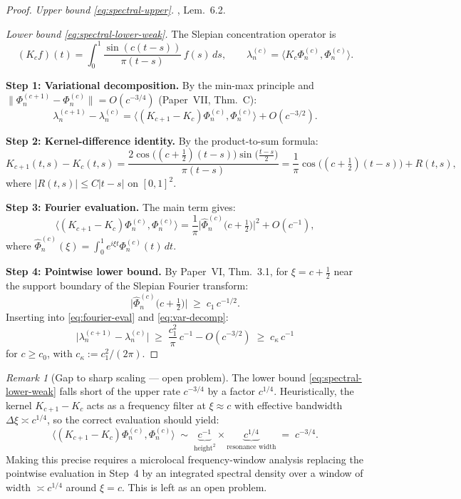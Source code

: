\documentclass[12pt,a4paper]{amsart}
\theoremstyle{definition}
\theoremstyle{remark}
\newtheorem{remark}[theorem]{Remark}
\newcommand{\Phihat}{\widehat{\Phi}}
\begin{document}
\begin{proof}
\textit{Upper bound \eqref{eq:spectral-upper}.}
\cite{PaperVII}, Lem.~6.2.

\textit{Lower bound \eqref{eq:spectral-lower-weak}.}
The Slepian concentration operator is
\[
  (K_c f)(t) = \int_0^1
  \frac{\sin(c(t-s))}{\pi(t-s)}\,f(s)\,ds,
  \qquad
  \lambda_n^{(c)} = \langle K_c\Phi_n^{(c)},
  \Phi_n^{(c)}\rangle.
\]

\textbf{Step 1: Variational decomposition.}
By the min-max principle and
$\|\Phi_n^{(c+1)} - \Phi_n^{(c)}\| = O(c^{-3/4})$
(Paper~VII, Thm.~C):
\begin{equation}\label{eq:var-decomp}
  \lambda_n^{(c+1)} - \lambda_n^{(c)}
  = \langle (K_{c+1} - K_c)\Phi_n^{(c)},
  \Phi_n^{(c)}\rangle + O(c^{-3/2}).
\end{equation}

\textbf{Step 2: Kernel-difference identity.}
By the product-to-sum formula:
\[
  K_{c+1}(t,s) - K_c(t,s)
  = \frac{2\cos\!\bigl((c+\tfrac{1}{2})(t-s)\bigr)
    \sin\!\bigl(\tfrac{t-s}{2}\bigr)}{\pi(t-s)}
  = \frac{1}{\pi}\cos\!\bigl((c+\tfrac{1}{2})(t-s)
  \bigr) + R(t,s),
\]
where $|R(t,s)| \le C|t-s|$ on $[0,1]^2$.

\textbf{Step 3: Fourier evaluation.}
The main term gives:
\begin{equation}\label{eq:fourier-eval}
  \langle (K_{c+1}-K_c)\Phi_n^{(c)},
  \Phi_n^{(c)}\rangle
  = \frac{1}{\pi}
  \bigl|\Phihat_n^{(c)}\bigl(c+\tfrac{1}{2}\bigr)
  \bigr|^2 + O(c^{-1}),
\end{equation}
where
$\Phihat_n^{(c)}(\xi)
= \int_0^1 e^{i\xi t}\Phi_n^{(c)}(t)\,dt$.

\textbf{Step 4: Pointwise lower bound.}
By Paper~VI, Thm.~3.1, for $\xi = c + \frac{1}{2}$
near the support boundary of the Slepian
Fourier transform:
\[
  \bigl|\Phihat_n^{(c)}\bigl(c+\tfrac{1}{2}\bigr)
  \bigr| \;\ge\; c_1\,c^{-1/2}.
\]
Inserting into \eqref{eq:fourier-eval} and
\eqref{eq:var-decomp}:
\[
  \bigl|\lambda_n^{(c+1)} - \lambda_n^{(c)}\bigr|
  \;\ge\; \frac{c_1^2}{\pi}\,c^{-1} - O(c^{-3/2})
  \;\ge\; c_\kappa\,c^{-1}
\]
for $c \ge c_0$, with $c_\kappa := c_1^2/(2\pi)$.
\end{proof}

\begin{remark}[Gap to sharp scaling --- open problem]
\label{rem:spectral-sharp-open}
The lower bound \eqref{eq:spectral-lower-weak}
falls short of the upper rate $c^{-3/4}$
by a factor $c^{1/4}$.
Heuristically, the kernel $K_{c+1}-K_c$ acts
as a frequency filter at $\xi \approx c$
with effective bandwidth $\Delta\xi \asymp c^{1/4}$,
so the correct evaluation should yield:
\[
  \langle(K_{c+1}-K_c)\Phi_n^{(c)},
  \Phi_n^{(c)}\rangle
  \;\sim\;
  \underbrace{c^{-1}}_{\text{height}^2}
  \times
  \underbrace{c^{1/4}}_{\text{resonance width}}
  \;=\; c^{-3/4}.
\]
Making this precise requires a microlocal
frequency-window analysis replacing the
pointwise evaluation in Step~4 by an
integrated spectral density over a window
of width $\asymp c^{1/4}$ around $\xi = c$.
This is left as an open problem.
\end{remark}
\end{document}
